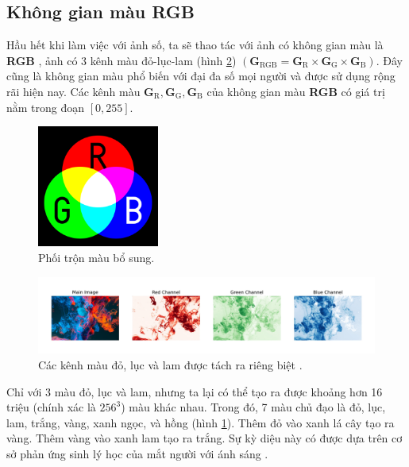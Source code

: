 \documentclass[a4paper, 12pt]{report}
\begin{document}
\subsection{Không gian màu RGB}

Hầu hết khi làm việc với ảnh số, ta sẽ thao tác với ảnh có không gian màu là \textbf{RGB} \cite{wikirgb2021}, ảnh có 3 kênh màu đỏ-lục-lam (hình \ref{fig:inspectrgb}) $\left(\bm{G}_{\text{RGB}} = \bm{G}_{\text{R}}\times \bm{G}_{\text{G}}\times \bm{G}_{\text{B}}\right)$.
Đây cũng là không gian màu phổ biến với đại đa số mọi người và được sử dụng rộng rãi hiện nay.
Các kênh màu $\bm{G}_{\text{R}}, \bm{G}_{\text{G}}, \bm{G}_{\text{B}}$ của không gian màu \textbf{RGB} có giá trị nằm trong đoạn $[0, 255]$.\vspace{5pt}

\begin{figure}[!h]
\captionsetup{width=0.8\textwidth}
\centering
\includegraphics[width=4cm]{images/rgbmodel.png}
\caption{Phối trộn màu bổ sung.}
\label{fig:rgbmodel}
\end{figure}

\begin{figure}[!h]
\captionsetup{width=0.8\textwidth}
\centering
\includegraphics[width=16cm]{images/2_1.jpeg}
\caption{Các kênh màu đỏ, lục và lam được tách ra riêng biệt \cite{moeincolorization2020}.}
\label{fig:inspectrgb}
\end{figure}

Chỉ với 3 màu đỏ, lục và lam, nhưng ta lại có thể tạo ra được khoảng hơn 16 triệu (chính xác là $256^3$) màu khác nhau.
Trong đó, 7 màu chủ đạo là đỏ, lục, lam, trắng, vàng, xanh ngọc, và hồng (hình \ref{fig:rgbmodel}).
Thêm đỏ vào xanh lá cây tạo ra vàng.
Thêm vàng vào xanh lam tạo ra trắng.
Sự kỳ diệu này có được dựa trên cơ sở phản ứng sinh lý học của mắt người với ánh sáng \cite{wikirgb2021}.\vspace{5pt}
\end{document}
